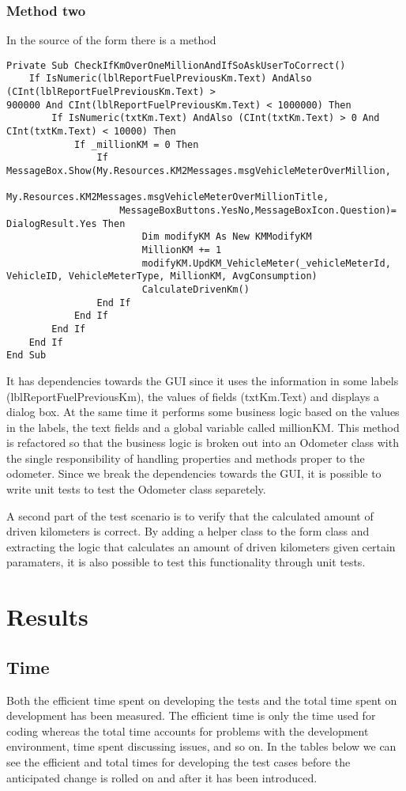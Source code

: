 \documentclass{article}
\begin{document}
			\subsubsection{Method two}

			In the source of the form there is a method
			\begin{lstlisting}
Private Sub CheckIfKmOverOneMillionAndIfSoAskUserToCorrect()
	If IsNumeric(lblReportFuelPreviousKm.Text) AndAlso (CInt(lblReportFuelPreviousKm.Text) >
900000 And CInt(lblReportFuelPreviousKm.Text) < 1000000) Then
		If IsNumeric(txtKm.Text) AndAlso (CInt(txtKm.Text) > 0 And CInt(txtKm.Text) < 10000) Then
			If _millionKM = 0 Then
				If MessageBox.Show(My.Resources.KM2Messages.msgVehicleMeterOverMillion,
					My.Resources.KM2Messages.msgVehicleMeterOverMillionTitle,
					MessageBoxButtons.YesNo,MessageBoxIcon.Question)= DialogResult.Yes Then
						Dim modifyKM As New KMModifyKM 
						MillionKM += 1
						modifyKM.UpdKM_VehicleMeter(_vehicleMeterId, VehicleID, VehicleMeterType, MillionKM, AvgConsumption)
						CalculateDrivenKm()
				End If
			End If
		End If
	End If
End Sub
		\end{lstlisting}

			It has dependencies towards the GUI since it uses the information in some labels
			(lblReportFuelPreviousKm), the values of fields (txtKm.Text) and displays a dialog box.
			At the same time it performs some business logic based on the values in the labels, the text fields and a global variable called millionKM.
			This method is refactored so that the business logic is broken out into an Odometer class with the single responsibility of handling properties and methods proper to the odometer. Since we break the dependencies towards the GUI, it is possible to write unit tests to test the Odometer class separetely.

			A second part of the test scenario is to verify that the calculated amount of driven kilometers is correct. By adding a helper class to the form class and extracting the logic that calculates an amount of driven kilometers given certain paramaters, it is also possible to test this functionality through unit tests.

	\section{Results}
		\subsection{Time}
		Both the efficient time spent on developing the tests and the total time spent on development has been measured. The efficient time is only the time used for coding whereas the total time accounts for problems with the development environment, time spent discussing issues, and so on.
		In the tables below we can see the efficient and total times for developing the test cases before the anticipated change is rolled on and after it has been introduced.
\end{document}
